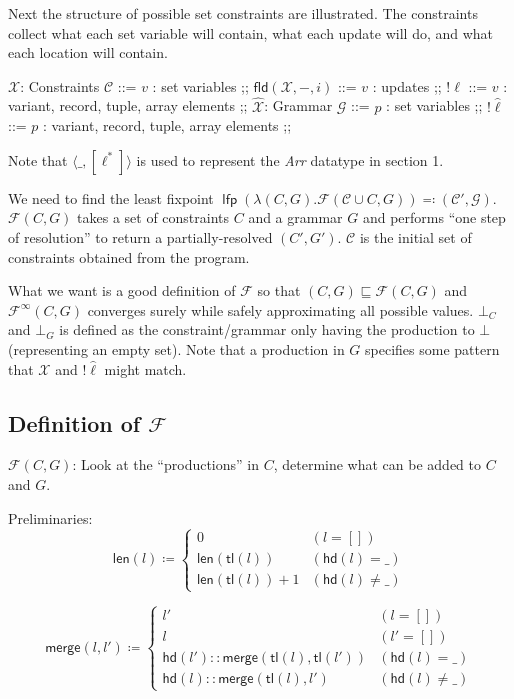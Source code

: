 \documentclass[a4paper]{article}
\begin{document}
Next the structure of possible set constraints are illustrated. The constraints collect what each set variable will contain, what each update will do, and what each location will contain.
\RenewDocumentCommand\SimpleBNFDefEq{}{\ensuremath{\supseteq}}
\begin{bnfgrammar}[rrcll]
  $\mathcal{X}$: Constraints $\mathcal{C}$ ::= $v$ : set variables
;;
  $\mathsf{fld}(\mathcal{X}, -, i)$ ::= $v$ : updates
;;
  $!\ell$ ::= $v$ : variant, record, tuple, array elements
;;
  $\mathcal{\hat X}$: Grammar $\mathcal{G}$ ::= $p$ : set variables
;;
  $!\hat\ell$ ::= $p$ : variant, record, tuple, array elements
;;
  \end{bnfgrammar}
\RenewDocumentCommand{}

Note that $\langle\_,[\ell^*]\rangle$ is used to represent the \textit{Arr} datatype in section 1.

We need to find the least fixpoint $\operatorname{\mathsf{lfp}}(\lambda (C,G).\mathcal{F}(\mathcal{C}\cup C,G)) \eqcolon (\mathcal{C'},\mathcal G)$. $\mathcal{F}(C,G)$ takes a set of constraints $C$ and a grammar $G$ and performs ``one step of resolution'' to return a partially-resolved $(C',G')$. $\mathcal{C}$ is the initial set of constraints obtained from the program.

What we want is a good definition of $\mathcal{F}$ so that $(C,G)\sqsubseteq\mathcal{F}(C,G)$ and $\mathcal{F}^\infty(C,G)$ converges surely while safely approximating all possible values. $\bot_C$ and $\bot_G$ is defined as the constraint/grammar only having the production to $\bot$(representing an empty set). Note that a production in $G$ specifies some pattern that $\mathcal{X}$ and $!\hat\ell$ might match.

\subsection{Definition of $\mathcal{F}$}
$\mathcal{F}(C,G)$: Look at the ``productions'' in $C$, determine what can be added to $C$ and $G$.

Preliminaries:
$$\mathsf{len}(l)\coloneq\begin{cases}
0 & (l=[])\\
\mathsf{len}(\mathsf{tl}(l)) & (\mathsf{hd}(l)=\_)\\
\mathsf{len}(\mathsf{tl}(l)) + 1 & (\mathsf{hd}(l)\neq\_)
\end{cases}$$

$$\mathsf{merge}(l,l')\coloneq\begin{cases}
l' & (l=[])\\
l & (l'=[])\\
\mathsf{hd}(l')::\mathsf{merge}(\mathsf{tl}(l),\mathsf{tl}(l')) & (\mathsf{hd}(l)=\_)\\
\mathsf{hd}(l)::\mathsf{merge}(\mathsf{tl}(l),l') & (\mathsf{hd}(l)\neq\_)
\end{cases}$$
\end{document}
